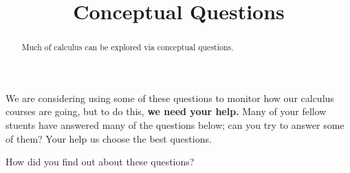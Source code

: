 \documentclass{ximera}
\title{Conceptual Questions}
\begin{document}
\begin{abstract}
  Much of calculus can be explored via conceptual questions.
\end{abstract}
\maketitle

We are considering using some of these questions to monitor how our
calculus courses are going, but to do this, \textbf{we need your
  help.}  Many of your fellow stuents have answered many of the
questions below; can you try to answer some of them?  Your help us
choose the best questions.

\begin{question}
How did you find out about these questions?
\begin{freeResponse}
\end{freeResponse}
\end{question}
\end{document}

